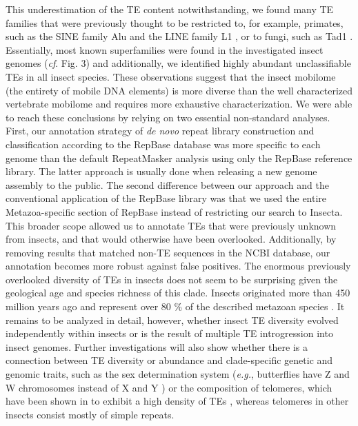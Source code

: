 This underestimation of the TE content notwithstanding, we found many TE
families that were previously thought to be restricted to, for example,
primates, such as the SINE family Alu \citep{Kriegs2007} and the LINE
family L1 \citep{Liu2003}, or to fungi, such as Tad1
\citep{Cambareri1994}. Essentially, most known superfamilies were found
in the investigated insect genomes (\emph{cf}. Fig. 3) and additionally,
we identified highly abundant unclassifiable TEs in all insect species.
These observations suggest that the insect mobilome (the entirety of
mobile DNA elements) is more diverse than the well characterized
vertebrate mobilome \citep{Chalopin2015} and requires more exhaustive
characterization. We were able to reach these conclusions by relying on
two essential non-standard analyses. First, our annotation strategy of
\emph{de novo} repeat library construction and classification according
to the RepBase database was more specific to each genome than the
default RepeatMasker analysis using only the RepBase reference library.
The latter approach is usually done when releasing a new genome assembly
to the public. The second difference between our approach and the
conventional application of the RepBase library was that we used the
entire Metazoa-specific section of RepBase instead of restricting our
search to Insecta. This broader scope allowed us to annotate TEs that
were previously unknown from insects, and that would otherwise have been
overlooked. Additionally, by removing results that matched non-TE
sequences in the NCBI database, our annotation becomes more robust
against false positives. The enormous previously overlooked diversity of
TEs in insects does not seem to be surprising given the geological age
and species richness of this clade. Insects originated more than 450
million years ago \citep{Misof2014} and represent over 80 \% of the
described metazoan species \citep{Grimaldi2005}. It remains to be
analyzed in detail, however, whether insect TE diversity evolved
independently within insects or is the result of multiple TE
introgression into insect genomes. Further investigations will also show
whether there is a connection between TE diversity or abundance and
clade-specific genetic and genomic traits, such as the sex determination
system (\emph{e.g.}, butterflies have Z and W chromosomes instead of X
and Y \citep{Traut1997}) or the composition of telomeres, which have
been shown in  to exhibit a high density of TEs
\citep{Levis1993}, whereas telomeres in other insects consist mostly of
simple repeats.

